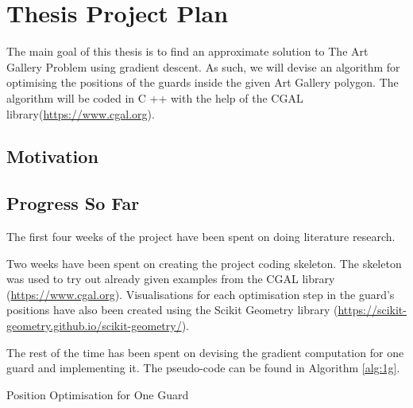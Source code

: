 \section{Thesis Project Plan}
\label{sec:thesis}

The main goal of this thesis is to find an approximate solution to The Art Gallery Problem \cite{o1987art} using gradient descent. As such, we will devise an algorithm for optimising the positions of the guards inside the given Art Gallery polygon. 
The algorithm will be coded in C ++ with the help of the CGAL library(\url{https://www.cgal.org}).

\subsection{Motivation}

\subsection{Progress So Far}
The first four weeks of the project have been spent on doing literature research.

Two weeks have been spent on creating the project coding skeleton. The skeleton was used to try out already given examples from the CGAL library (\url{https://www.cgal.org}). Visualisations for each optimisation step in the guard's positions have also been created using the Scikit Geometry library (\url{https://scikit-geometry.github.io/scikit-geometry/}).

The rest of the time has been spent on devising the gradient computation for one guard and implementing it.
The pseudo-code can be found in Algorithm \ref{alg:1g}.

\begin{algorithm}
    \begin{algorithmic}[1]
    \caption{Position Optimisation for One Guard}
    \label{alg:1g}

         

            \EndIf
        \EndWhile
    \EndFor
    \end{algorithmic}
\end{algorithm}

